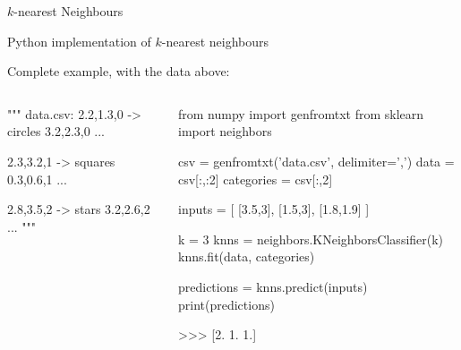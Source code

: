 \documentclass[compress]{beamer}
\begin{document}
\begin{frame}{$k$-nearest Neighbours}
\begin{center}
{
        }
    \end{center}

\end{frame}

\begin{frame}[fragile]{Python implementation of $k$-nearest neighbours}

    Complete example, with the data above:

\begin{columns}
    \begin{column}{0.4\linewidth}
\begin{pythoncode}
""" data.csv:
2.2,1.3,0 -> circles
3.2,2.3,0
...

2.3,3.2,1 -> squares
0.3,0.6,1
...

2.8,3.5,2 -> stars
3.2,2.6,2
...
"""
\end{pythoncode}
        
    \end{column}
    \begin{column}{0.6\linewidth}
\begin{pythoncode}
from numpy import genfromtxt
from sklearn import neighbors

csv = genfromtxt('data.csv', delimiter=',')
data = csv[:,:2]
categories = csv[:,2]

inputs = [ [3.5,3], [1.5,3], [1.8,1.9] ]

k = 3
knns = neighbors.KNeighborsClassifier(k)
knns.fit(data, categories)

predictions = knns.predict(inputs)
print(predictions)

>>>  [2.  1.  1.]

\end{pythoncode}
    \end{column}
\end{columns}



\end{frame}
\end{document}
